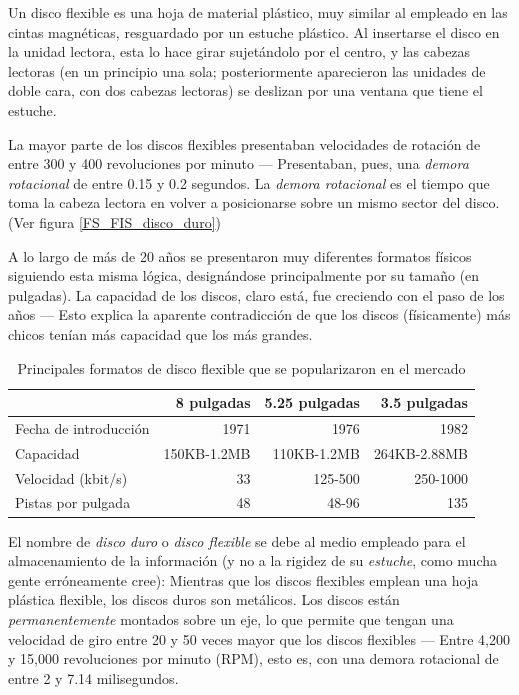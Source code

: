 \documentclass[11pt,fleqn]{book} %
\begin{document}
Un disco flexible es una hoja de material plástico, muy similar al
empleado en las cintas magnéticas, resguardado por un estuche
plástico. Al insertarse el disco en la unidad lectora, esta lo hace
girar sujetándolo por el centro, y las cabezas lectoras (en un
principio una sola; posteriormente aparecieron las unidades de doble
cara, con dos cabezas lectoras) se deslizan por una ventana que tiene
el estuche.

La mayor parte de los discos flexibles presentaban velocidades de
rotación de entre 300 y 400 revoluciones por minuto — Presentaban,
pues, una \emph{demora rotacional} de entre 0.15 y 0.2 segundos. La \emph{demora rotacional} es el tiempo que toma la cabeza lectora en volver a
posicionarse sobre un mismo sector del disco. (Ver figura
\ref{FS_FIS_disco_duro})

A lo largo de más de 20 años se presentaron muy diferentes formatos
físicos siguiendo esta misma lógica, designándose principalmente por
su tamaño (en pulgadas). La capacidad de los discos, claro está, fue
creciendo con el paso de los años — Esto explica la aparente
contradicción de que los discos (físicamente) más chicos tenían más
capacidad que los más grandes.

\begin{table}[htb]
\caption{Principales formatos de disco flexible que se popularizaron en el mercado} 
\begin{center}
\begin{tabular}{lrrr}
\hline
                        &   8 pulgadas  &  5.25 pulgadas  &  3.5 pulgadas  \\
\hline
 Fecha de introducción  &         1971  &           1976  &          1982  \\
 Capacidad              &  150KB-1.2MB  &    110KB-1.2MB  &  264KB-2.88MB  \\
 Velocidad (kbit/s)     &           33  &        125-500  &      250-1000  \\
 Pistas por pulgada     &           48  &          48-96  &           135  \\
\hline
\end{tabular}
\end{center}
\end{table}


El nombre de \emph{disco duro} o \emph{disco flexible} se debe al medio empleado
para el almacenamiento de la información (y no a la rigidez de su
\emph{estuche}, como mucha gente erróneamente cree): Mientras que los discos
flexibles emplean una hoja plástica flexible, los
discos duros son metálicos. Los discos están \emph{permanentemente}
montados sobre un eje, lo que permite que tengan una velocidad de giro
entre 20 y 50 veces mayor que los discos flexibles — Entre 4,200 y
15,000 revoluciones por minuto (RPM), esto es, con una demora
rotacional de entre 2 y 7.14 milisegundos.
\end{document}
